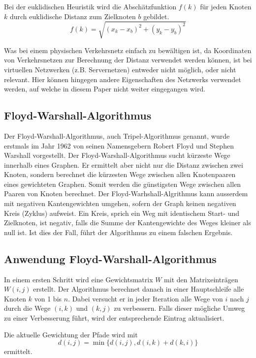 Bei der euklidischen Heuristik wird die Abschätzfunktion $f(k)$ für jeden Knoten $k$ durch euklidische Distanz zum Zielknoten $b$ gebildet.
\begin{equation}
f(k)=\sqrt{(x_k-x_b)^2+(y_k-y_b)^2}
\end{equation}

Was bei einem physischen Verkehrsnetz einfach zu bewältigen ist, da Koordinaten von Verkehrsnetzen zur Berechnung der Distanz verwendet werden können, ist bei virtuellen Netzwerken (z.B. Servernetzen) entweder nicht möglich, oder nicht relevant. Hier können hingegen andere Eigenschaften des Netzwerks verwendet werden, auf welche in diesem Paper nicht weiter eingegangen wird.

\subsection{Floyd-Warshall-Algorithmus}
Der Floyd-Warshall-Algorithmus, auch Tripel-Algorithmus genannt, wurde erstmals im Jahr 1962 von seinen Namensgebern Robert Floyd und Stephen Warshall vorgestellt.
Der Floyd-Warshall-Algorithmus sucht kürzeste Wege innerhalb eines Graphen. Er ermittelt aber nicht nur die Distanz zwischen zwei Knoten, sondern berechnet die kürzesten Wege zwischen allen Knotenpaaren eines gewichteten Graphen. Somit werden die günstigsten Wege zwischen allen Paaren von Knoten berechnet. Der Floyd-Warhshall-Algrithmus kann ausserdem mit negativen Kantengewichten umgehen, sofern der Graph keinen negativen Kreis (Zyklus) aufweist. Ein Kreis, sprich ein Weg mit identischem Start- und Zielknoten, ist negativ, falls die Summe der Kantengewichte des Weges kleiner als null ist. Ist dies der Fall, führt der Algorithmus zu einem falschen Ergebnis.

\subsection{Anwendung Floyd-Warshall-Algorithmus}

In einem ersten Schritt wird eine Gewichtsmatrix $W$ mit den Matrixeinträgen $W(i, j)$ erstellt.
Der Algorithmus berechnet danach in einer Hauptschleife alle Knoten $k$ von 1 bis $n$.
Dabei versucht er in jeder Iteration alle Wege von $i$ nach $j$ durch die Wege $(i, k)$ und $(k, j)$ zu verbessern.
Falls dieser mögliche Umweg zu einer Verbesserung führt, wird der entsprechende Eintrag aktualisiert.

Die aktuelle Gewichtung der Pfade wird mit
\begin{equation}d(i, j)=\min\{d(i,j), d(i,k) + d(k,i)\}\end{equation}
ermittelt.



